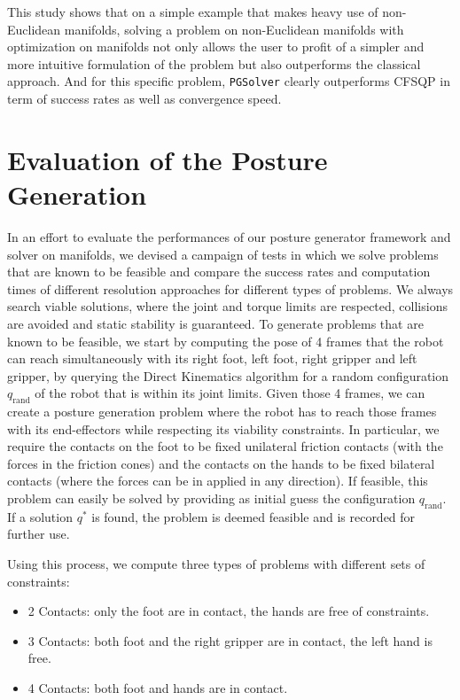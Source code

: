 This study shows that on a simple example that makes heavy use of non-Euclidean manifolds, solving a problem on non-Euclidean manifolds with optimization on manifolds not only allows the user to profit of a simpler and more intuitive formulation of the problem but also outperforms the classical approach.
And for this specific problem, {\tt PGSolver} clearly outperforms CFSQP in term of success rates as well as convergence speed.


\section{Evaluation of the Posture Generation}
\label{sec:evaluation_of_the_posture_generation}

In an effort to evaluate the performances of our posture generator framework and solver on manifolds, we devised a campaign of tests in which we solve problems that are known to be feasible and compare the success rates and computation times of different resolution approaches for different types of problems.
We always search viable solutions, where the joint and torque limits are respected, collisions are avoided and static stability is guaranteed.
To generate problems that are known to be feasible, we start by computing the pose of 4 frames that the robot can reach simultaneously with its right foot, left foot, right gripper and left gripper,%
by querying the Direct Kinematics algorithm for a random configuration $q_\text{rand}$ of the robot that is within its joint limits.
Given those 4 frames, we can create a posture generation problem where the robot has to reach those frames with its end-effectors while respecting its viability constraints.
In particular, we require the contacts on the foot to be fixed unilateral friction contacts (with the forces in the friction cones) and the contacts on the hands to be fixed bilateral contacts (where the forces can be in applied in any direction).
If feasible, this problem can easily be solved by providing as initial guess the configuration $q_\text{rand}$.
If a solution $q^*$ is found, the problem is deemed feasible and is recorded for further use.

Using this process, we compute three types of problems with different sets of constraints:
\begin{itemize}
  \item 2 Contacts: only the foot are in contact, the hands are free of constraints.
  \item 3 Contacts: both foot and the right gripper are in contact, the left hand is free.
  \item 4 Contacts: both foot and hands are in contact.
\end{itemize}

